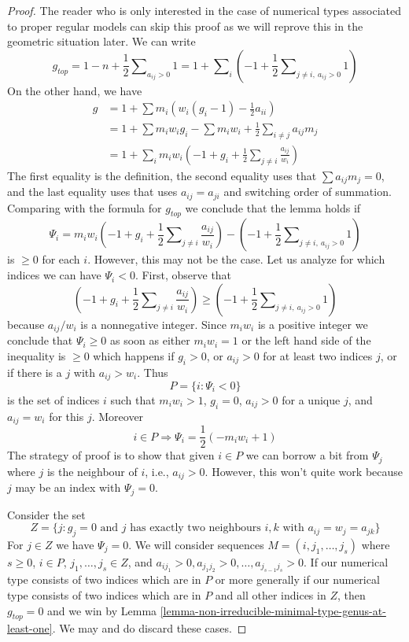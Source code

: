 \documentclass[10pt,a4paper]{amsart}
\theoremstyle{plain}
\theoremstyle{definition}
\theoremstyle{remark}
\numberwithin{equation}{subsection}
\begin{document}
\begin{proof}
The reader who is only interested in the case of numerical types
associated to proper regular models can skip this proof as we will
reprove this in the geometric situation later.
We can write
$$
g_{top} = 1 - n + \frac{1}{2}\sum\nolimits_{a_{ij} > 0} 1 =
1 + \sum\nolimits_i (-1 +
\frac{1}{2}\sum\nolimits_{j \not = i,\ a_{ij} > 0} 1) 
$$
On the other hand, we have
\begin{align*}
g & =
1 + \sum m_i(w_i(g_i - 1) - \frac{1}{2} a_{ii}) \\
& =
1 + \sum m_iw_ig_i - \sum m_iw_i +
\frac{1}{2} \sum\nolimits_{i \not = j} a_{ij}m_j \\
& =
1 + \sum\nolimits_i
m_iw_i(-1 + g_i + \frac{1}{2} \sum\nolimits_{j \not = i} \frac{a_{ij}}{w_i})
\end{align*}
The first equality is the definition, the second equality uses that
$\sum a_{ij}m_j = 0$, and the last equality uses that
uses $a_{ij} = a_{ji}$ and switching order of
summation. Comparing with the formula for $g_{top}$ we conclude
that the lemma holds if
$$
\Psi_i =
m_iw_i(-1 + g_i + \frac{1}{2} \sum\nolimits_{j \not = i} \frac{a_{ij}}{w_i})
- (-1 + \frac{1}{2}\sum\nolimits_{j \not = i,\ a_{ij} > 0} 1)
$$
is $\geq 0$ for each $i$. However, this may not be the case.
Let us analyze for which indices we can have $\Psi_i < 0$.
First, observe that
$$
(-1 + g_i + \frac{1}{2}\sum\nolimits_{j \not = i} \frac{a_{ij}}{w_i}) \geq
(-1 + \frac{1}{2}\sum\nolimits_{j \not = i,\ a_{ij} > 0} 1)
$$
because $a_{ij}/w_i$ is a nonnegative integer. Since $m_iw_i$ is
a positive integer we conclude that $\Psi_i \geq 0$ as soon as
either $m_iw_i = 1$ or the left hand side of the inequality is $\geq 0$
which happens if $g_i > 0$, or $a_{ij} > 0$ for at least two indices $j$, or
if there is a $j$ with $a_{ij} > w_i$. Thus
$$
P = \{i : \Psi_i < 0\}
$$
is the set of indices $i$ such that $m_iw_i > 1$, $g_i = 0$,
$a_{ij} > 0$ for a unique $j$, and $a_{ij} = w_i$ for this $j$.
Moreover
$$
i \in P \Rightarrow \Psi_i = \frac{1}{2}(-m_iw_i + 1)
$$
The strategy of proof is to show that given $i \in P$ we can borrow a bit
from $\Psi_j$ where $j$ is the neighbour of $i$, i.e., $a_{ij} > 0$.
However, this won't quite work because $j$ may be an index with $\Psi_j = 0$.

\medskip\noindent
Consider the set
$$
Z = \{j : g_j = 0\text{ and }
j\text{ has exactly two neighbours }i, k\text{ with }
a_{ij} = w_j = a_{jk}\}
$$
For $j \in Z$ we have $\Psi_j = 0$. We will consider sequences
$M = (i, j_1, \ldots, j_s)$ where $s \geq 0$,
$i \in P$, $j_1, \ldots, j_s \in Z$, and
$a_{ij_1} > 0, a_{j_1j_2} > 0, \ldots, a_{j_{s - 1}j_s} > 0$.
If our numerical type consists of two indices which are in $P$
or more generally if our numerical type consists of
two indices which are in $P$ and all other indices in $Z$, then
$g_{top} = 0$ and we win by
Lemma \ref{lemma-non-irreducible-minimal-type-genus-at-least-one}.
We may and do discard these cases.


\end{proof}
\end{document}
